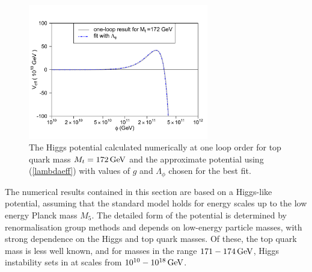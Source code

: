 \documentclass[aps,12pt,prd,superscriptaddress,preprintnumbers, 
	amssymb,
	amsmath,
	notitlepage,
	longbibliography,
	nofootinbib]{revtex4-1}
\begin{document}
\begin{figure}[htb]
\centering
\includegraphics[width=0.7\textwidth]{fit.pdf}
\caption{The Higgs potential calculated numerically at one loop order for top
quark mass $M_t=172\,{\rm GeV}$ and the
approximate potential using (\ref{lambdaeff}) with values of $g$ and 
$\Lambda_\phi$ chosen
for the best fit.}
\label{fig:potential}
\end{figure}

The numerical results contained in this section are based on a Higgs-like potential,
assuming that the standard model holds for energy scales up to the low energy
Planck mass $M_5$. The detailed form of the potential is determined by
renormalisation group methods and depends on low-energy particle masses,
with strong dependence on the Higgs and top quark masses. Of these, the
top quark mass is less well known, and for masses in the range
$171-174\, {\rm GeV}$, Higgs instability sets in at scales from 
$10^{10}-10^{18}\,{\rm GeV}$.
\end{document}
